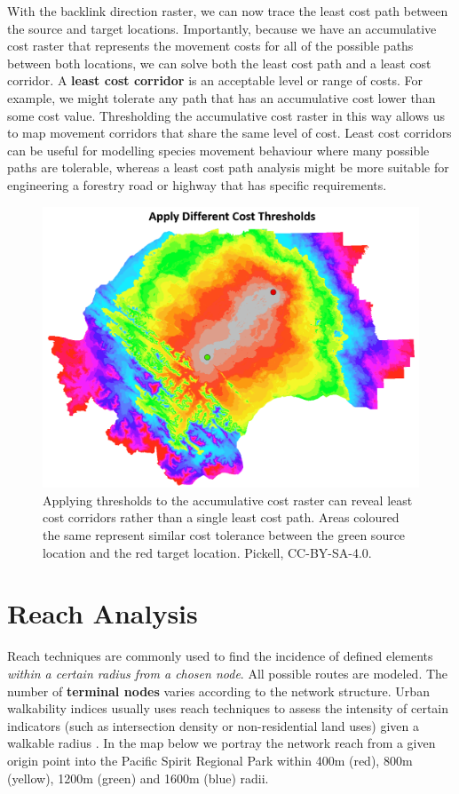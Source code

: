 \documentclass[
]{book}
\begin{document}
With the backlink direction raster, we can now trace the least cost path between the source and target locations. Importantly, because we have an accumulative cost raster that represents the movement costs for all of the possible paths between both locations, we can solve both the least cost path and a least cost corridor. A \textbf{least cost corridor} is an acceptable level or range of costs. For example, we might tolerate any path that has an accumulative cost lower than some cost value. Thresholding the accumulative cost raster in this way allows us to map movement corridors that share the same level of cost. Least cost corridors can be useful for modelling species movement behaviour where many possible paths are tolerable, whereas a least cost path analysis might be more suitable for engineering a forestry road or highway that has specific requirements.

\begin{figure}
\includegraphics[width=0.75\linewidth]{images/08-cost-thresholds} \caption{Applying thresholds to the accumulative cost raster can reveal least cost corridors rather than a single least cost path. Areas coloured the same represent similar cost tolerance between the green source location and the red target location. Pickell, CC-BY-SA-4.0.}\label{fig:8-cost-thresholds}
\end{figure}

\section{Reach Analysis}\label{reach-analysis}

Reach techniques are commonly used to find the incidence of defined elements \emph{within a certain radius from a chosen node}. All possible routes are modeled. The number of \textbf{terminal nodes} varies according to the network structure. Urban walkability indices usually uses reach techniques to assess the intensity of certain indicators (such as intersection density or non-residential land uses) given a walkable radius \citep{martino_spatial_2020}. In the map below we portray the network reach from a given origin point into the Pacific Spirit Regional Park within 400m (red), 800m (yellow), 1200m (green) and 1600m (blue) radii.
\end{document}
